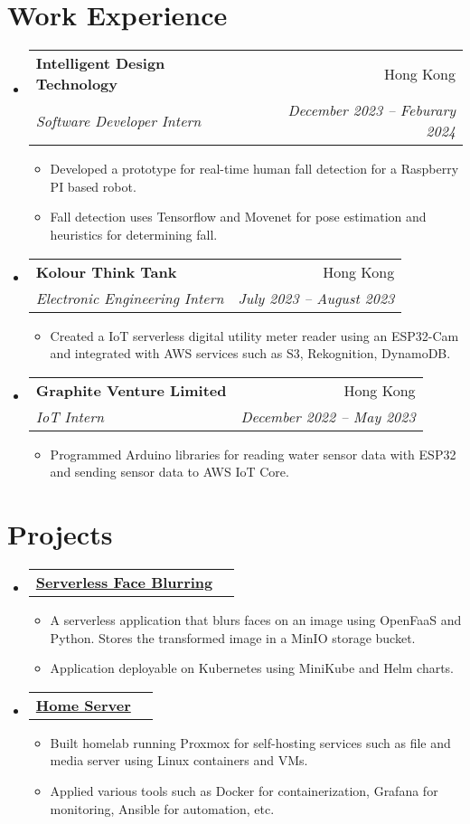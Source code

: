 \documentclass[letterpaper,12pt]{article}
\makeatletter
\newcommand{\resumeItem}[1]{
  \item\small{
    {#1 \vspace{-2pt}}
  }
}
\newcommand{\resumeSubheading}[4]{
  \vspace{-1pt}\item
    \begin{tabular*}{0.98\textwidth}[t]{l@{\extracolsep{\fill}}r}
      \textbf{#1} & #2 \\
      \textit{\small#3} & \textit{\small #4} \\
    \end{tabular*}\vspace{-7pt}
}
\newcommand{\resumeProjectHeading}[2]{
    \item
    \begin{tabular*}{0.97\textwidth}{l@{\extracolsep{\fill}}r}
      \small#1 & #2 \\
    \end{tabular*}\vspace{-7pt}
}
\newcommand{\resumeSubHeadingListStart}{\begin{itemize}[leftmargin=0.05in, label={}]}
\newcommand{\resumeSubHeadingListEnd}{\end{itemize}}
\newcommand{\resumeItemListStart}{\begin{itemize}}
\newcommand{\resumeItemListEnd}{\end{itemize}\vspace{-5pt}}
\makeatother
\begin{document}
\section{Work Experience}
  \resumeSubHeadingListStart

    \resumeSubheading
        {{{Intelligent Design Technology}}}{Hong Kong}
        {Software Developer Intern}{December 2023 -- Feburary 2024}
        \vspace{1pt}
        \resumeItemListStart 
          \resumeItem{\normalsize{Developed a prototype for real-time human fall detection for a Raspberry PI based robot.}}
          \resumeItem{\normalsize{Fall detection uses Tensorflow and Movenet for pose estimation and heuristics for determining fall.}}
        \resumeItemListEnd

    \resumeSubheading
        {{{Kolour Think Tank}}}{Hong Kong}
        {Electronic Engineering Intern}{July 2023 -- August 2023}
        \vspace{1pt}
        \resumeItemListStart 
          \resumeItem{\normalsize{Created a IoT serverless digital utility meter reader using an ESP32-Cam and integrated with AWS services such as S3, Rekognition, DynamoDB.}}
        \resumeItemListEnd

    \resumeSubheading
      {{{Graphite Venture Limited}}}{Hong Kong}
      {IoT Intern}{December 2022 -- May 2023}
      \vspace{1pt}
      \resumeItemListStart 
        \resumeItem{\normalsize{Programmed Arduino libraries for reading water sensor data with ESP32 and sending sensor data to AWS IoT Core.}}
      \resumeItemListEnd



  \resumeSubHeadingListEnd

\section{Projects}
    \resumeSubHeadingListStart

    \resumeProjectHeading
      {\textbf{\href{https://github.com/jamesyoung-15/serverless-face-blurring}{ {Serverless Face Blurring}}}    \emph{}}{}
      \resumeItemListStart
        \resumeItem{\normalsize{A serverless application that blurs faces on an image using OpenFaaS and Python. Stores the transformed image in a MinIO storage bucket.}} 
        \resumeItem{\normalsize{Application deployable on Kubernetes using MiniKube and Helm charts.}}
      \resumeItemListEnd

    \resumeProjectHeading
        {\textbf{\href{https://github.com/jamesyoung-15/homeserver}{ {Home Server}}} \emph{}}{}
        \resumeItemListStart
          \resumeItem{\normalsize{Built homelab running Proxmox for self-hosting services such as file and media server using Linux containers and VMs.}}
          \resumeItem{\normalsize{Applied various tools such as Docker for containerization, Grafana for monitoring, Ansible for automation, etc.}}
        \resumeItemListEnd



    \resumeSubHeadingListEnd
\end{document}
